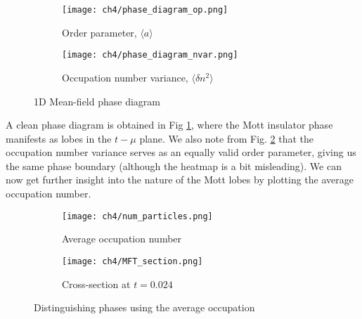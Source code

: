 \begin{figure}[!htb]
    \centering
    \begin{subfigure}[b]{0.45\textwidth}  %
        \centering
        \texttt{[image: ch4/phase\_diagram\_op.png]}
        \caption{Order parameter, $\langle a \rangle$}
        \label{fig:mft_pd}
    \end{subfigure}
    \hspace{1em}  %
    \begin{subfigure}[b]{0.45\textwidth}
        \centering
        \texttt{[image: ch4/phase\_diagram\_nvar.png]}
        \caption{Occupation number variance, $\langle \delta n^2 \rangle$}
        \label{fig:mft_occvar}
    \end{subfigure}
    \caption{1D Mean-field phase diagram}
    \label{}
\end{figure}
\FloatBarrier \!\!\!\!\!\!\!\!\!\!\!

A clean phase diagram is obtained in Fig \ref{fig:mft_pd}, where the Mott insulator phase manifests as lobes in the $t-\mu$ plane. We also note from Fig. \ref{fig:mft_occvar} that the occupation number variance serves as an equally valid order parameter, giving us the same phase boundary (although the heatmap is a bit misleading). We can now get further insight into the nature of the Mott lobes by plotting the average occupation number.
\begin{figure}[!htb]
    \centering
    \begin{subfigure}[b]{0.43\textwidth}  %
        \centering
        \texttt{[image: ch4/num\_particles.png]}
        \caption{Average occupation number}
    \end{subfigure}
    \hspace{1em}  %
    \begin{subfigure}[b]{0.4\textwidth}
        \centering
        \texttt{[image: ch4/MFT\_section.png]}
        \caption{Cross-section at $t = 0.024$}
    \end{subfigure}
    \caption{Distinguishing phases using the average occupation}
    \label{fig:mft_avg_occ}
\end{figure}
\FloatBarrier \!\!\!\!\!\!\!\!\!\!\!

